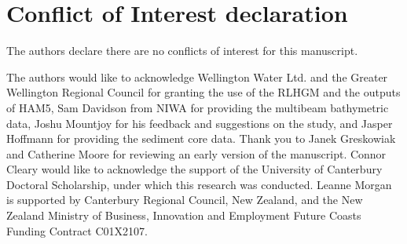 \documentclass[draft, 10pt]{agujournal2019}
\begin{document}
\section*{Conflict of Interest declaration}
The authors declare there are no conflicts of interest for this manuscript.

\acknowledgments
The authors would like to acknowledge Wellington Water Ltd. and the Greater Wellington Regional Council for granting the use of the RLHGM and the outputs of HAM5, Sam Davidson from NIWA for providing the multibeam bathymetric data, Joshu Mountjoy for his feedback and suggestions on the study, and Jasper Hoffmann for providing the sediment core data. Thank you to Janek Greskowiak and Catherine Moore for reviewing an early version of the manuscript. Connor Cleary would like to acknowledge the support of the University of Canterbury Doctoral Scholarship, under which this research was conducted. Leanne Morgan is supported by Canterbury Regional Council, New Zealand, and the New Zealand Ministry of Business, Innovation and Employment Future Coasts Funding Contract C01X2107. %


\end{document}
